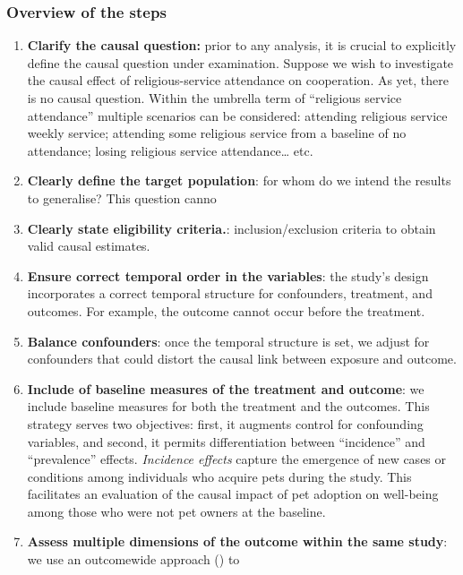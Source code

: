 \documentclass[
  singlecolumn]{article}
\begin{document}
\subsubsection{Overview of the steps}\label{overview-of-the-steps}

\begin{enumerate}
\def\labelenumi{\arabic{enumi}.}
\item
  \textbf{Clarify the causal question:} prior to any analysis, it is
  crucial to explicitly define the causal question under examination.
  Suppose we wish to investigate the causal effect of religious-service
  attendance on cooperation. As yet, there is no causal question. Within
  the umbrella term of ``religious service attendance'' multiple
  scenarios can be considered: attending religious service weekly
  service; attending some religious service from a baseline of no
  attendance; losing religious service attendance\ldots{} etc.
\item
  \textbf{Clearly define the target population}: for whom do we intend
  the results to generalise? This question canno
\item
  \textbf{Clearly state eligibility criteria.}: inclusion/exclusion
  criteria to obtain valid causal estimates.
\item
  \textbf{Ensure correct temporal order in the variables}: the study's
  design incorporates a correct temporal structure for confounders,
  treatment, and outcomes. For example, the outcome cannot occur before
  the treatment.
\item
  \textbf{Balance confounders}: once the temporal structure is set, we
  adjust for confounders that could distort the causal link between
  exposure and outcome.
\item
  \textbf{Include of baseline measures of the treatment and outcome}: we
  include baseline measures for both the treatment and the outcomes.
  This strategy serves two objectives: first, it augments control for
  confounding variables, and second, it permits differentiation between
  ``incidence'' and ``prevalence'' effects. \emph{Incidence effects}
  capture the emergence of new cases or conditions among individuals who
  acquire pets during the study. This facilitates an evaluation of the
  causal impact of pet adoption on well-being among those who were not
  pet owners at the baseline.
\item
  \textbf{Assess multiple dimensions of the outcome within the same
  study}: we use an outcomewide approach
  () to

\end{enumerate}
\end{document}
